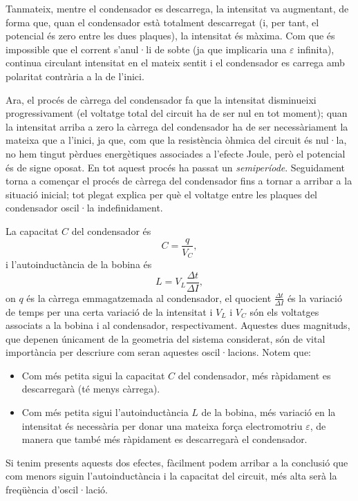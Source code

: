 \documentclass[a4paper,10.5pt]{report}
\begin{document}
Tanmateix, mentre el condensador es descarrega, la intensitat va augmentant, de forma que, quan el condensador està totalment descarregat (i, per tant, el potencial és zero entre les dues plaques), la intensitat és màxima. Com que és impossible que el corrent s'anul·li de sobte (ja que implicaria una $\varepsilon$ infinita), continua circulant intensitat en el mateix sentit i el condensador es carrega amb polaritat contrària a la de l'inici. 

Ara, el procés de càrrega del condensador fa que la intensitat disminueixi progressivament (el voltatge total del circuit ha de ser nul en tot moment); quan la intensitat arriba a zero la càrrega del condensador ha de ser necessàriament la mateixa que a l'inici, ja que, com que la resistència òhmica del circuit és nul·la, no hem tingut pèrdues energètiques associades a l'efecte Joule, però el potencial és de signe oposat. En tot aquest procés ha passat un \textit{semiperíode}. Seguidament torna a començar el procés de càrrega del condensador fins a tornar a arribar a la situació inicial; tot plegat explica per què el voltatge entre les plaques del condensador oscil·la indefinidament.

La capacitat $C$ del condensador és
\begin{equation}
	C = \frac{q}{V_C}, \label{eq:3.2}
\end{equation}
i l'autoinductància de la bobina és
\begin{equation}
	L = V_L \frac{\Delta t}{\Delta I}, \label{eq:3.3}
\end{equation}
on $q$ és la càrrega emmagatzemada al condensador, el quocient $\frac{\Delta t}{\Delta I}$ és la variació de temps per una certa variació de la intensitat i  $V_L$ i $V_C$ són els voltatges associats a la bobina i al condensador, respectivament. Aquestes dues magnituds, que depenen únicament de la geometria del sistema considerat, són de vital importància per descriure com seran aquestes oscil·lacions. Notem que: 
\begin{itemize}
	\item Com més petita sigui la capacitat $C$ del condensador, més ràpidament es descarregarà (té menys càrrega).
	\item Com més petita sigui l'autoinductància $L$ de la bobina, més variació en la intensitat és necessària per donar una mateixa força electromotriu $\varepsilon$, de manera que també més ràpidament es descarregarà el condensador.
\end{itemize}
Si tenim presents aquests dos efectes, fàcilment podem arribar a la conclusió que com menors siguin l'autoinductància i la capacitat del circuit, més alta serà la freqüència d'oscil·lació.
\end{document}
